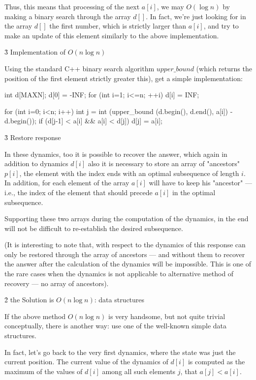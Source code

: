 Thus, this means that processing of the next $a[i]$, we may $O (\log n)$ by making a binary search through the array $d[]$. In fact, we're just looking for in the array $d[]$ the first number, which is strictly larger than $a[i]$, and try to make an update of this element similarly to the above implementation.


\h3{ Implementation of $O (n \log n)$ }

Using the standard C++ binary search algorithm $upper\_bound$ (which returns the position of the first element strictly greater this), get a simple implementation:

\code
int d[MAXN];
d[0] = -INF;
for (int i=1; i<=n; ++i)
d[i] = INF;

for (int i=0; i<n; i++) {
int j = int (upper_bound (d.begin(), d.end(), a[i]) - d.begin());
if (d[j-1] < a[i] && a[i] < d[j])
d[j] = a[i];
}
\endcode


\h3{ Restore response }

In these dynamics, too it is possible to recover the answer, which again in addition to dynamics $d[i]$ also it is necessary to store an array of "ancestors" $p[i]$, the element with the index ends with an optimal subsequence of length $i$. In addition, for each element of the array $a[i]$ will have to keep his "ancestor" --- i.e., the index of the element that should precede $a[i]$ in the optimal subsequence.

Supporting these two arrays during the computation of the dynamics, in the end will not be difficult to re-establish the desired subsequence.

(It is interesting to note that, with respect to the dynamics of this response can only be restored through the array of ancestors --- and without them to recover the answer after the calculation of the dynamics will be impossible. This is one of the rare cases when the dynamics is not applicable to alternative method of recovery --- no array of ancestors).



\h2{ the Solution is $O (n \log n)$: data structures }

If the above method $O (n \log n)$ is very handsome, but not quite trivial conceptually, there is another way: use one of the well-known simple data structures.

In fact, let's go back to the very first dynamics, where the state was just the current position. The current value of the dynamics of $d[i]$ is computed as the maximum of the values of $d[i]$ among all such elements $j$, that $a[j] < a[i]$.

